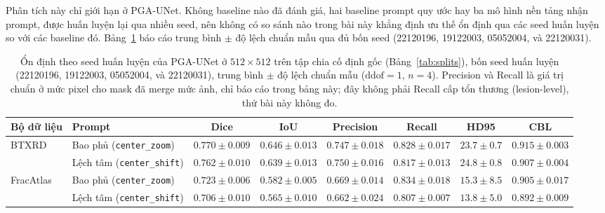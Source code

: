\documentclass[11pt]{article}
\begin{document}
Phân tích này chỉ giới hạn ở PGA-UNet. Không baseline nào đã đánh giá, hai baseline prompt quy ước hay ba mô hình nền tảng nhận prompt, được huấn luyện lại qua nhiều seed, nên không có so sánh nào trong bài này khẳng định ưu thế ổn định qua các seed huấn luyện so với các baseline đó. Bảng~\ref{tab:seedstability} báo cáo trung bình $\pm$ độ lệch chuẩn mẫu qua đủ bốn seed (22120196, 19122003, 05052004, và 22120031).

\begin{table}[t]
\caption{Ổn định theo seed huấn luyện của PGA-UNet ở $512\times512$ trên tập chia cố định gốc (Bảng~\ref{tab:splits}), bốn seed huấn luyện (22120196, 19122003, 05052004, và 22120031), trung bình $\pm$ độ lệch chuẩn mẫu ($\mathrm{ddof}=1$, $n=4$). Precision và Recall là giá trị chuẩn ở mức pixel cho mask đã merge mức ảnh, chỉ báo cáo trong bảng này; đây không phải Recall cấp tổn thương (lesion-level), thứ bài này không đo.}
\label{tab:seedstability}
\centering
\scriptsize
\begin{tabular}{llcccccc}
\toprule
Bộ dữ liệu & Prompt & Dice & IoU & Precision & Recall & HD95 & CBL \\
\midrule
\multirow{2}{*}{BTXRD}
& Bao phủ (\texttt{center\_zoom}) & $0.770\pm0.009$ & $0.646\pm0.013$ & $0.747\pm0.018$ & $0.828\pm0.017$ & $23.7\pm0.7$ & $0.915\pm0.003$ \\
& Lệch tâm (\texttt{center\_shift}) & $0.762\pm0.010$ & $0.639\pm0.013$ & $0.750\pm0.016$ & $0.817\pm0.013$ & $24.8\pm0.8$ & $0.907\pm0.004$ \\
\midrule
\multirow{2}{*}{FracAtlas}
& Bao phủ (\texttt{center\_zoom}) & $0.723\pm0.006$ & $0.582\pm0.005$ & $0.669\pm0.014$ & $0.834\pm0.018$ & $15.3\pm8.5$ & $0.905\pm0.017$ \\
& Lệch tâm (\texttt{center\_shift}) & $0.706\pm0.010$ & $0.565\pm0.010$ & $0.662\pm0.024$ & $0.807\pm0.007$ & $13.8\pm5.0$ & $0.892\pm0.009$ \\
\bottomrule
\end{tabular}
\end{table}
\end{document}
